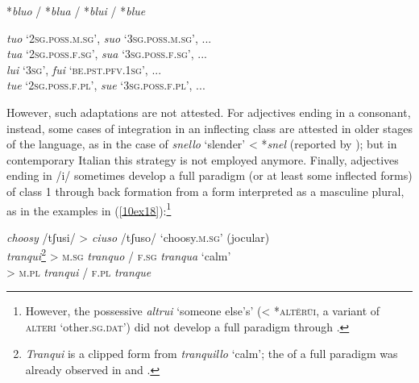 \documentclass[output=paper,colorlinks,citecolor=brown]{langscibook}
\begin{document}
\begin{exe}
	\ex \label{10ex17}
	\begin{xlist}
		\ex \label{10ex17a} *\emph{bluo} / *\emph{blua} / *\emph{blui} / *\emph{blue}
		
		\ex \label{10ex17b} \emph{tuo} ‘2\textsc{sg.poss.m.sg}’, \emph{suo} ‘3\textsc{sg.poss.m.sg}’, ... \\
		\emph{tua} ‘2\textsc{sg.poss.f.sg}’, \emph{sua} ‘3\textsc{sg.poss.f.sg}’, ... \\
		\emph{lui} ‘3\textsc{sg}’, \emph{fui} ‘\textsc{be.pst.pfv.1sg}’, ... \\
		\emph{tue} ‘2\textsc{sg.poss.f.pl}’, \emph{sue} ‘3\textsc{sg.poss.f.pl}’, ...
	\end{xlist}
\end{exe}

However, such adaptations are not attested. For adjectives ending in a consonant, instead, some cases of integration in an inflecting class are attested in older stages of the language, as in the case of \emph{snello} `slender' \textless{}  *\emph{snel} (reported by \citealt[179]{repetti2012}); but in contemporary Italian this strategy is not employed anymore. Finally, adjectives ending in /i/ sometimes develop a full paradigm (or at least some inflected forms) of class 1 through back formation from a form interpreted as a masculine plural, as in the examples in (\ref{10ex18}):\footnote{However, the possessive \emph{altrui} `someone else's' (\textless{}  *\textsc{altĕrūi}, a variant of \textsc{alteri} `other.\textsc{sg.dat'}) did not develop a full paradigm through .}

\begin{exe}
	\ex \label{10ex18}
		\emph{choosy} /tʃusi/ \hspace*{0.5cm} > \hspace*{0.2cm} \emph{ciuso} /tʃuso/	‘choosy.\textsc{m.sg}’ (jocular) \\
		\emph{tranqui}\footnote{\emph{Tranqui} is a clipped form from \emph{tranquillo} ‘calm’; the  of a full paradigm was already observed in \citet[266]{thornton2007} and \citet[101]{dachille2005-retroforma}.} \hspace*{1.15cm} > \hspace*{0.2cm} \textsc{m.sg} \emph{tranquo} / \textsc{f.sg} \emph{tranqua} ‘calm’  \\
		\hspace*{2.7cm} > \hspace*{0.2cm} \textsc{m.pl} \emph{tranqui} / \textsc{f.pl} \emph{tranque}
\end{exe}
\end{document}
